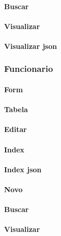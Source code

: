 \paragraph{Buscar}

\paragraph{Visualizar}

\paragraph{Visualizar json}


\subsubsection{Funcionario}
\paragraph{Form}

\paragraph{Tabela}

\paragraph{Editar}

\paragraph{Index}

\paragraph{Index json}

\paragraph{Novo}

\paragraph{Buscar}

\paragraph{Visualizar}

